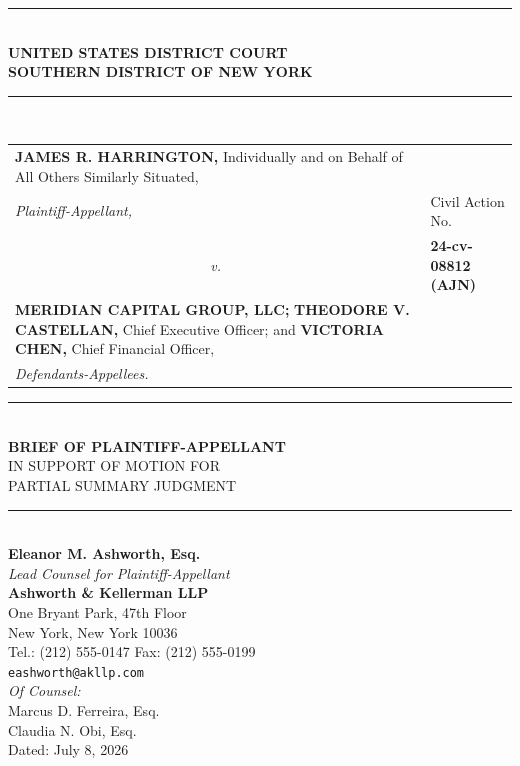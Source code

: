 \documentclass[12pt,letterpaper]{article}
\begin{document}
\thispagestyle{plain}

\begin{center}
  {\color{accent}\rule{\linewidth}{1.8pt}}\\[6pt]
  {%
  \large\bfseries\color{accent}
  UNITED STATES DISTRICT COURT\\[3pt]
  SOUTHERN DISTRICT OF NEW YORK\\[10pt]
  }%
  {\color{ruled}\rule{\linewidth}{0.6pt}}\\[14pt]

  \begin{tabularx}{\linewidth}{@{} X @{\quad} l @{}}
    \textbf{JAMES R. HARRINGTON,} Individually and\newline
    on Behalf of All Others Similarly Situated, &
    \\[2pt]
    \hspace{2em}\textit{Plaintiff-Appellant,} &
    Civil Action No.\\[4pt]
    \multicolumn{1}{c}{\textit{v.}} &
    \textbf{24-cv-08812 (AJN)}\\[4pt]
    \textbf{MERIDIAN CAPITAL GROUP, LLC;}
    \textbf{THEODORE V. CASTELLAN,}
    Chief Executive Officer; and
    \textbf{VICTORIA CHEN,}
    Chief Financial Officer, &
    \\[2pt]
    \hspace{2em}\textit{Defendants-Appellees.} &
    \\
  \end{tabularx}

  \vspace{10pt}
  {\color{ruled}\rule{\linewidth}{0.6pt}}\\[12pt]

  {%
  \LARGE\bfseries\color{accent}
  BRIEF OF PLAINTIFF-APPELLANT\\[6pt]
  }%
  {\large\color{midgray}
  IN SUPPORT OF MOTION FOR\\
  PARTIAL SUMMARY JUDGMENT\\[6pt]
  }%

  {\color{accent}\rule{\linewidth}{1.8pt}}\\[14pt]

  {%
  \normalsize
  \textbf{Eleanor M. Ashworth, Esq.}\\
  \textit{Lead Counsel for Plaintiff-Appellant}\\[4pt]
  \textbf{Ashworth \& Kellerman LLP}\\
  One Bryant Park, 47th Floor\\
  New York, New York 10036\\
  Tel.: (212) 555-0147 \quad Fax: (212) 555-0199\\
  \texttt{eashworth@akllp.com}\\[6pt]
  \textit{Of Counsel:}\\
  Marcus D. Ferreira, Esq.\\
  Claudia N. Obi, Esq.\\[10pt]
  Dated: July 8, 2026
  }%
\end{center}
\end{document}

